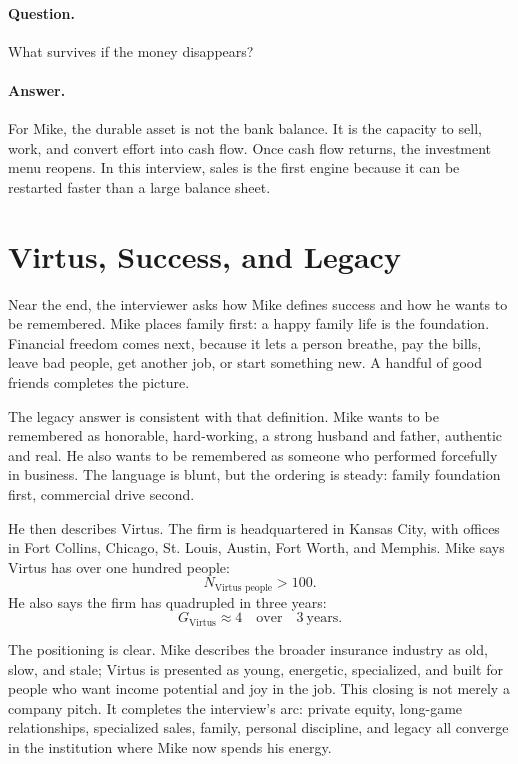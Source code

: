 \paragraph{Question.}
What survives if the money disappears?

\paragraph{Answer.}
For Mike, the durable asset is not the bank balance. It is the capacity to sell, work, and convert effort into cash flow. Once cash flow returns, the investment menu reopens. In this interview, sales is the first engine because it can be restarted faster than a large balance sheet.

\section{Virtus, Success, and Legacy}

Near the end, the interviewer asks how Mike defines success and how he wants to be remembered. Mike places family first: a happy family life is the foundation. Financial freedom comes next, because it lets a person breathe, pay the bills, leave bad people, get another job, or start something new. A handful of good friends completes the picture.

The legacy answer is consistent with that definition. Mike wants to be remembered as honorable, hard-working, a strong husband and father, authentic and real. He also wants to be remembered as someone who performed forcefully in business. The language is blunt, but the ordering is steady: family foundation first, commercial drive second.

He then describes Virtus. The firm is headquartered in Kansas City, with offices in Fort Collins, Chicago, St. Louis, Austin, Fort Worth, and Memphis. Mike says Virtus has over one hundred people:
\begin{equation}
N_{\text{Virtus people}} > 100.
\end{equation}
He also says the firm has quadrupled in three years:
\begin{equation}
G_{\text{Virtus}} \approx 4
\quad \text{over} \quad
3\ \text{years}.
\end{equation}

The positioning is clear. Mike describes the broader insurance industry as old, slow, and stale; Virtus is presented as young, energetic, specialized, and built for people who want income potential and joy in the job. This closing is not merely a company pitch. It completes the interview's arc: private equity, long-game relationships, specialized sales, family, personal discipline, and legacy all converge in the institution where Mike now spends his energy.

